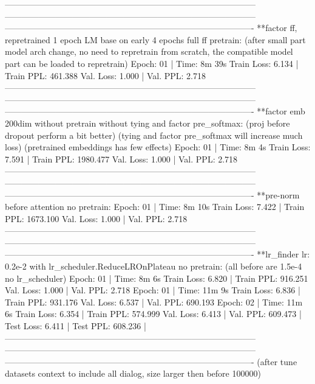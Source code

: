 \documentclass[letterpaper]{article} %
\begin{document}
\begin{CJK*}{UTF8}{gbsn}
-----------------------------------------------------------------------------------------
-----------------------------------------------------------------------------------------
----------------------------------------------------------------------------------------
**factor ff, repretrained 1 epoch LM base on early 4 epochs full ff pretrain:
(after small part model arch change, no need to repretrain from scratch,
the compatible model part can be loaded to repretrain)
Epoch: 01 | Time: 8m 39s
	Train Loss: 6.134 | Train PPL: 461.388
	 Val. Loss: 1.000 |  Val. PPL:   2.718
-----------------------------------------------------------------------------------------
-----------------------------------------------------------------------------------------
----------------------------------------------------------------------------------------
**factor emb 200dim without pretrain without tying and factor pre_softmax:
(proj before dropout perform a bit better)
(tying and factor pre_softmax will increase much loss)
(pretrained embeddings has few effects)
Epoch: 01 | Time: 8m 4s
	Train Loss: 7.591 | Train PPL: 1980.477
	 Val. Loss: 1.000 |  Val. PPL:   2.718
-----------------------------------------------------------------------------------------
-----------------------------------------------------------------------------------------
----------------------------------------------------------------------------------------
**pre-norm before attention no pretrain:
Epoch: 01 | Time: 8m 10s
	Train Loss: 7.422 | Train PPL: 1673.100
	 Val. Loss: 1.000 |  Val. PPL:   2.718
-----------------------------------------------------------------------------------------
-----------------------------------------------------------------------------------------
----------------------------------------------------------------------------------------
**lr_finder lr: 0.2e-2 with lr_scheduler.ReduceLROnPlateau no pretrain:
(all before are 1.5e-4 no lr_scheduler)
Epoch: 01 | Time: 8m 6s
	Train Loss: 6.820 | Train PPL: 916.251
	 Val. Loss: 1.000 |  Val. PPL:   2.718
Epoch: 01 | Time: 11m 9s
	Train Loss: 6.836 | Train PPL: 931.176
	 Val. Loss: 6.537 |  Val. PPL: 690.193
Epoch: 02 | Time: 11m 6s
	Train Loss: 6.354 | Train PPL: 574.999
	 Val. Loss: 6.413 |  Val. PPL: 609.473
| Test Loss: 6.411 | Test PPL: 608.236 |
-----------------------------------------------------------------------------------------
-----------------------------------------------------------------------------------------
----------------------------------------------------------------------------------------
(after tune datasets context to include all dialog, size larger then before 100000)

\end{CJK*}
\end{document}
